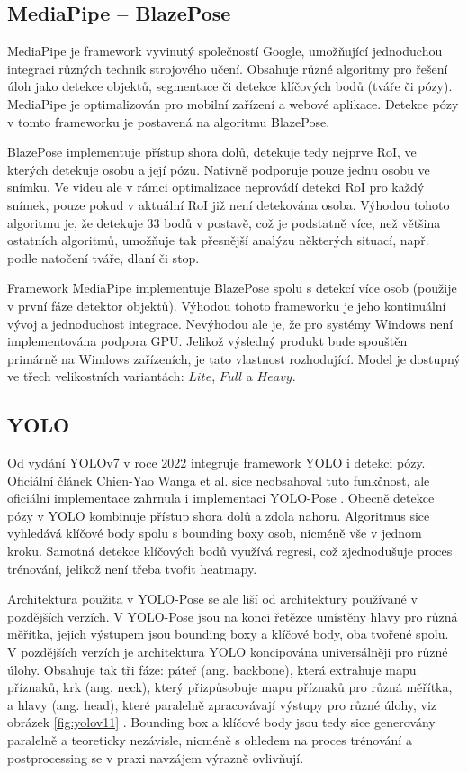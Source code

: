 \subsection{MediaPipe – BlazePose}

MediaPipe je framework vyvinutý společností Google, umožňující jednoduchou
integraci různých technik strojového učení. Obsahuje různé algoritmy pro řešení
úloh jako detekce objektů, segmentace či detekce klíčových bodů (tváře či
pózy). MediaPipe je optimalizován pro mobilní zařízení a webové aplikace.
Detekce pózy v tomto frameworku je postavená na algoritmu BlazePose.

BlazePose implementuje přístup shora dolů, detekuje tedy nejprve RoI, ve
kterých detekuje osobu a její pózu. Nativně podporuje pouze jednu osobu ve
snímku. Ve videu ale v rámci optimalizace neprovádí detekci RoI pro každý
snímek, pouze pokud v aktuální RoI již není detekována osoba. Výhodou tohoto
algoritmu je, že detekuje 33 bodů v postavě, což je podstatně více, než většina
ostatních algoritmů, umožňuje tak přesnější analýzu některých situací, např.
podle natočení tváře, dlaní či stop.

Framework MediaPipe implementuje BlazePose spolu s detekcí více osob (použije v
první fáze detektor objektů). Výhodou tohoto frameworku je jeho
kontinuální vývoj a jednoduchost integrace. Nevýhodou ale je, že pro systémy
Windows není implementována podpora GPU. Jelikož výsledný produkt bude
spouštěn primárně na Windows zařízeních, je tato vlastnost rozhodující.
Model je dostupný ve třech velikostních variantách: $Lite$, $Full$ a $Heavy$.

\subsection{YOLO}

Od vydání YOLOv7 v roce 2022 integruje framework YOLO i detekci pózy. Oficiální
článek Chien-Yao Wanga et al. \cite{yolov7} sice neobsahoval tuto funkčnost,
ale oficiální implementace zahrnula i implementaci YOLO-Pose \cite{yolo-pose}.
Obecně detekce pózy v YOLO kombinuje přístup shora dolů a zdola nahoru.
Algoritmus sice vyhledává klíčové body spolu s bounding boxy osob, nicméně vše
v jednom kroku. Samotná detekce klíčových bodů využívá regresi, což
zjednodušuje proces trénování, jelikož není třeba tvořit heatmapy.

Architektura použita v YOLO-Pose se ale liší od architektury používané v
pozdějších verzích. V YOLO-Pose jsou na konci řetězce umístěny hlavy pro různá
měřítka, jejich výstupem jsou bounding boxy a klíčové body, oba tvořené spolu.
V pozdějších verzích je architektura YOLO koncipována universálněji pro různé
úlohy. Obsahuje tak tři fáze\cite{yolov11}: páteř (ang. backbone), která
extrahuje mapu příznaků, krk (ang. neck), který přizpůsobuje mapu příznaků pro
různá měřítka, a hlavy (ang. head), které paralelně zpracovávají výstupy pro
různé úlohy, viz obrázek \ref{fig:yolov11} . Bounding box a klíčové body jsou
tedy sice generovány paralelně a teoreticky nezávisle, nicméně s ohledem na
proces trénování a postprocessing se v praxi navzájem výrazně ovlivňují.

